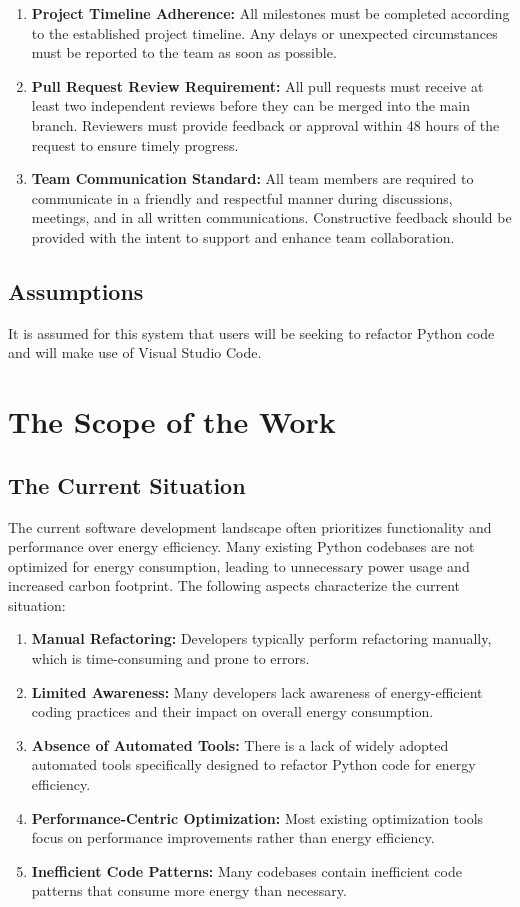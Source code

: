 \documentclass[12pt]{article}
\begin{document}
\begin{enumerate}
  \item \textbf{Project Timeline Adherence:} All milestones must be completed according to the established project timeline. Any delays or unexpected circumstances must be reported to the team as soon as possible.
  \item \textbf{Pull Request Review Requirement:} All pull requests must receive at least two independent reviews before they can be merged into the main branch. Reviewers must provide feedback or approval within 48 hours of the request to ensure timely progress.
  \item \textbf{Team Communication Standard:} All team members are required to communicate in a friendly and respectful manner during discussions, meetings, and in all written communications. Constructive feedback should be provided with the intent to support and enhance team collaboration.
\end{enumerate}


\subsection{Assumptions}
It is assumed for this system that users will be seeking to refactor Python code and will make use of Visual Studio Code.

\section{The Scope of the Work}
\subsection{The Current Situation}

  The current software development landscape often prioritizes functionality and performance over energy efficiency. Many existing Python codebases are not optimized for energy consumption, leading to unnecessary power usage and increased carbon footprint. The following aspects characterize the current situation:
  \begin{enumerate}
    \item \textbf{Manual Refactoring:} Developers typically perform refactoring manually, which is time-consuming and prone to errors.
    \item \textbf{Limited Awareness:} Many developers lack awareness of energy-efficient coding practices and their impact on overall energy consumption.
    \item \textbf{Absence of Automated Tools:} There is a lack of widely adopted automated tools specifically designed to refactor Python code for energy efficiency.
    \item \textbf{Performance-Centric Optimization:} Most existing optimization tools focus on performance improvements rather than energy efficiency.
    \item \textbf{Inefficient Code Patterns:} Many codebases contain inefficient code patterns that consume more energy than necessary.
  \end{enumerate}
\end{document}
